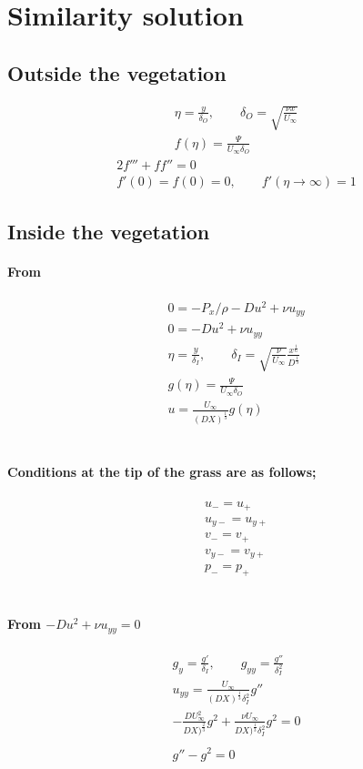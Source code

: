 \documentclass[11pt]{amsart}
\begin{document}
\section{Similarity solution}
\subsection{Outside the vegetation}
\begin{gather}
\eta = \frac{y}{\delta_O}, \qquad \delta_O = \sqrt{\frac{\nu x}{U_\infty}} \nonumber \\
f(\eta) = \frac{\Psi}{U_\infty \delta_O} \nonumber
\end{gather}
\begin{gather}
2f''' + ff'' = 0 \\
f'(0) = f(0) = 0, \qquad f'(\eta \rightarrow \infty) = 1
\end{gather}
\subsection{Inside the vegetation} 
\paragraph{From} 
\begin{gather}
0 = -P_x/ \rho -Du^2+ \nu u_{yy} \\
0 = -Du^2+ \nu u_{yy} \\
\eta = \frac{y}{\delta_I}, \qquad \delta_I = \sqrt{\frac{\nu}{U_\infty}} \frac{x^\frac{1}{6}}{D^\frac{1}{3}} \nonumber \\
g(\eta) = \frac{\Psi}{U_\infty \delta_O} \nonumber \\
u=\frac{U_\infty}{(DX)^\frac{1}{3}}g(\eta)
\end{gather}
\paragraph{ \\Conditions at the tip of the grass are as follows; \\}
\begin{gather}
u_- = u_+ \\ u_{y-} = u_{y+}\\ v_- = v_+\\v_{y-}=v_{y+}\\p_-=p_+
\end{gather}
\paragraph{\\From \( -Du^2+ \nu u_{yy} = 0 \)}
 \begin{gather}
g_{y} = \frac{g'}{\delta_I}, \qquad g_{yy} = \frac{g''}{\delta_I^2} \nonumber \\
u_{yy}=\frac{U_\infty}{(DX)^\frac{1}{3}\delta_I^2}g'' \nonumber \\
- \frac{D U_\infty^2}{DX)^\frac{2}{3}}g^2 + \frac{\nu U_\infty}{DX)^\frac{1}{3}\delta_I^2}g^2 = 0 \nonumber \\ \nonumber \\
g'' - g^2 = 0 \nonumber
\end{gather}
\end{document}

